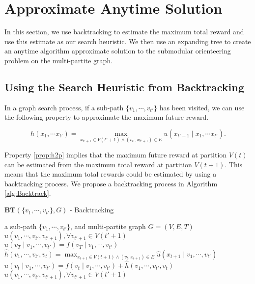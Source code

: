 \section{Approximate Anytime Solution}
\label{sec:submod_orienteer}

In this section, we use backtracking to estimate the maximum total reward and use this estimate as our search heuristic.
We then use an expanding tree to create an anytime algorithm approximate solution to the submodular orienteering problem on the multi-partite graph.

\subsection{Using the Search Heuristic from Backtracking}
\label{sec:backtrack}

In a graph search process, if a sub-path  $ \{ v_{1} , \cdots , v_{t'} \} $ has been visited, we can use the following property to approximate the maximum future reward. 
\begin{propty}
\label{prop:h2p}
\begin{equation}
\nonumber
\label{eq:h2p}
h( x_{1}, \cdots x_{t'} ) = \max_{x_{t'+1} \in V(t'+1) \land (v_{t'}, x_{t'+1}) \in E} u(x_{t'+1} \mid x_{1}, \cdots x_{t'} ).
\end{equation}
\end{propty}
Property \ref{prop:h2p} implies that the maximum future reward at partition $ V(t) $ can be estimated from the maximum total reward at partition $ V(t+1) $.
This means that the maximum total rewards could be estimated by using a backtracking process.
We propose a backtracking process in Algorithm \ref{alg:Backtrack}.

\begin{algorithm}
\caption{ $ \mathbf{BT}( \{ v_{1} , \cdots , v_{t'} \}, G ) $ - Backtracking }
\label{alg:Backtrack}
\begin{algorithmic}[1]
\REQUIRE
a sub-path $ \{ v_{1} , \cdots , v_{t'} \} $, and multi-partite graph $ G = ( V, E, T ) $
\ENSURE $ \hat{u}( v_{1} , \cdots , v_{t'} , v_{t'+1} ), \forall v_{t'+1} \in V(t'+1) $ \\
\STATE $ \hat{u}(v_{T} \mid v_{1} , \cdots , v_{t'} ) = f(v_{T} \mid v_{1} , \cdots , v_{t'} ) $
\ELSE
\STATE $ \hat{h}( v_{1} , \cdots , v_{t'},  v_{t} ) = \max_{ { x_{t+1} \in V(t+1) } \land { (v_{t}, x_{t+1}) \in E } } \hat{u}(x_{t+1} \mid v_{1} , \cdots , v_{t'} ) $
\STATE $ \hat{u}(v_{t} \mid v_{1} , \cdots , v_{t'} ) = f(v_{t} \mid v_{1} , \cdots , v_{t'} ) + \hat{h}( v_{1} , \cdots , v_{t'} , v_{t}) $
\ENDIF
\ENDFOR
\ENDFOR
\RETURN $ \hat{u}( v_{1} , \cdots , v_{t'}, v_{t'+1} ), \forall v_{t'+1} \in V(t'+1)  $
\end{algorithmic}
\end{algorithm}

